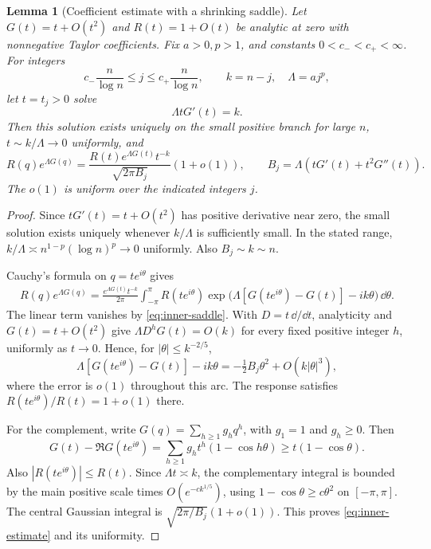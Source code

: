 \documentclass[11pt,a4paper]{article}
\numberwithin{equation}{section}
\newtheorem{lemma}[theorem]{Lemma}
\theoremstyle{definition}
\theoremstyle{remark}
\begin{document}
\begin{lemma}[Coefficient estimate with a shrinking saddle]
\label{lem:inner}
Let $G(t)=t+O(t^2)$ and $R(t)=1+O(t)$ be analytic at zero with
nonnegative Taylor coefficients. Fix $a>0,p>1$, and constants
$0<c_-<c_+<\infty$. For integers
\[
 c_-\frac n{\log n}\le j\le c_+\frac n{\log n},\qquad
 k=n-j,\quad\Lambda=a j^p,
\]
let $t=t_j>0$ solve
\begin{equation}
 \Lambda tG'(t)=k.
 \label{eq:inner-saddle}
\end{equation}
Then this solution exists uniquely on the small positive branch for large
$n$, $t\sim k/\Lambda\to0$ uniformly, and
\begin{equation}
 [q^k]R(q)e^{\Lambda G(q)}
 =\frac{R(t)e^{\Lambda G(t)}t^{-k}}
        {\sqrt{2\pi B_j}}(1+o(1)),
 \qquad B_j=\Lambda(tG'(t)+t^2G''(t)).
 \label{eq:inner-estimate}
\end{equation}
The $o(1)$ is uniform over the indicated integers $j$.
\end{lemma}

\begin{proof}
Since $tG'(t)=t+O(t^2)$ has positive derivative near zero, the small solution
exists uniquely whenever $k/\Lambda$ is sufficiently small. In the stated
range,
$k/\Lambda\asymp n^{1-p}(\log n)^p\to0$ uniformly. Also
$B_j\sim k\sim n$.

Cauchy's formula on $q=te^{i\theta}$ gives
\begin{align*}
 [q^k]R(q)e^{\Lambda G(q)}
 =\frac{e^{\Lambda G(t)}t^{-k}}{2\pi}
 \int_{-\pi}^{\pi}R(te^{i\theta})
 \exp\!\bigl(\Lambda[G(te^{i\theta})-G(t)]-ik\theta\bigr)\,\dd\theta.
\end{align*}
The linear term vanishes by \eqref{eq:inner-saddle}. With
$D=t\,\dd/\dd t$, analyticity and $G(t)=t+O(t^2)$ give
$\Lambda D^hG(t)=O(k)$ for every fixed positive integer $h$, uniformly
as $t\to0$. Hence, for $|\theta|\le k^{-2/5}$,
\[
 \Lambda[G(te^{i\theta})-G(t)]-ik\theta
 =-\tfrac12B_j\theta^2+O(k|\theta|^3),
\]
where the error is $o(1)$ throughout this arc. The response satisfies
$R(te^{i\theta})/R(t)=1+o(1)$ there.

For the complement, write $G(q)=\sum_{h\ge1}g_hq^h$, with $g_1=1$
and $g_h\ge0$. Then
\begin{equation}
 G(t)-\Re G(te^{i\theta})
 =\sum_{h\ge1}g_ht^h(1-\cos h\theta)
 \ge t(1-\cos\theta).
 \label{eq:circle-decay}
\end{equation}
Also $|R(te^{i\theta})|\le R(t)$. Since $\Lambda t\asymp k$, the
complementary integral is bounded by the main positive scale times
$O(e^{-c k^{1/5}})$, using $1-\cos\theta\ge c\theta^2$ on
$[-\pi,\pi]$. The central Gaussian integral is
$\sqrt{2\pi/B_j}(1+o(1))$. This proves
\eqref{eq:inner-estimate} and its uniformity.
\end{proof}
\end{document}
